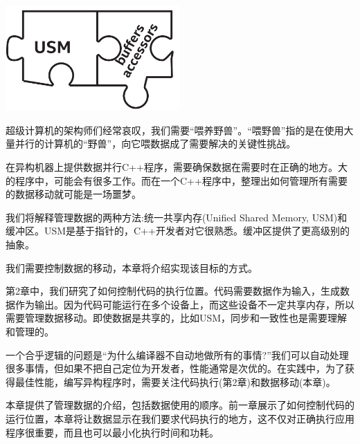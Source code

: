 \begin{center}
	\includegraphics[width=0.5\textwidth]{content/chapter-3/images/1}
\end{center}

超级计算机的架构师们经常哀叹，我们需要“喂养野兽”。“喂野兽”指的是在使用大量并行的计算机的“野兽”，向它喂数据成了需要解决的关键性挑战。\par

在异构机器上提供数据并行C++程序，需要确保数据在需要时在正确的地方。大的程序中，可能会有很多工作。而在一个C++程序中，整理出如何管理所有需要的数据移动就可能是一场噩梦。\par

我们将解释管理数据的两种方法:统一共享内存(Unified Shared Memory, USM)和缓冲区。USM是基于指针的，C++开发者对它很熟悉。缓冲区提供了更高级别的抽象。\par

我们需要控制数据的移动，本章将介绍实现该目标的方式。\par

第2章中，我们研究了如何控制代码的执行位置。代码需要数据作为输入，生成数据作为输出。因为代码可能运行在多个设备上，而这些设备不一定共享内存，所以需要管理数据移动。即使数据是共享的，比如USM，同步和一致性也是需要理解和管理的。\par

一个合乎逻辑的问题是“为什么编译器不自动地做所有的事情?”我们可以自动处理很多事情，但如果不把自己定位为开发者，性能通常是次优的。在实践中，为了获得最佳性能，编写异构程序时，需要关注代码执行(第2章)和数据移动(本章)。\par

本章提供了管理数据的介绍，包括数据使用的顺序。前一章展示了如何控制代码的运行位置，本章将让数据显示在我们要求代码执行的地方，这不仅对正确执行应用程序很重要，而且也可以最小化执行时间和功耗。\par








